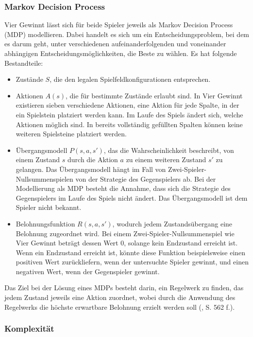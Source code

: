 \subsubsection{Markov Decision Process}

Vier Gewinnt lässt sich für beide Spieler jeweils als Markov Decision Process (MDP) modellieren. Dabei handelt es sich um ein Entscheidungsproblem, bei dem es darum geht, unter verschiedenen aufeinanderfolgenden und voneinander abhängigen Entscheidungsmöglichkeiten, die Beste zu wählen. Es hat folgende Bestandteile:

\begin{itemize}
	
\item Zustände $S$, die den legalen Spielfeldkonfigurationen entsprechen.
\item Aktionen $A(s)$, die für bestimmte Zustände erlaubt sind. In Vier Gewinnt existieren sieben verschiedene Aktionen, eine Aktion für jede Spalte, in der ein Spielstein platziert werden kann. Im Laufe des Spiels ändert sich, welche Aktionen möglich sind. In bereits vollständig gefüllten Spalten können keine weiteren Spielsteine platziert werden.
\item Übergangsmodell $P(s, a, s')$, das die Wahrscheinlichkeit beschreibt, von einem Zustand $s$ durch die Aktion $a$ zu einem weiteren Zustand $s'$ zu gelangen. Das Übergangsmodell hängt im Fall von Zwei-Spieler-Nullsummenspielen von der Strategie des Gegenspielers ab. Bei der Modellierung als MDP besteht die Annahme, dass sich die Strategie des Gegenspielers im Laufe des Spiels nicht ändert. Das Übergangsmodell ist dem Spieler nicht bekannt.
\item Belohnungsfunktion $R(s, a, s')$, wodurch jedem Zustandsübergang eine Belohnung zugeordnet wird. Bei einem Zwei-Spieler-Nullsummenspiel wie Vier Gewinnt beträgt dessen Wert 0, solange kein Endzustand erreicht ist. Wenn ein Endzustand erreicht ist, könnte diese Funktion beispielsweise einen positiven Wert zurückliefern, wenn der untersuchte Spieler gewinnt, und einen negativen Wert, wenn der Gegenspieler gewinnt.

\end{itemize}

Das Ziel bei der Lösung eines MDPs besteht darin, ein Regelwerk zu finden, das jedem Zustand jeweils eine Aktion zuordnet, wobei durch die Anwendung des Regelwerks die höchste erwartbare Belohnung erzielt werden soll (\cite{Russell.2020}, S. 562 f.).

\subsubsection{Komplexität}

